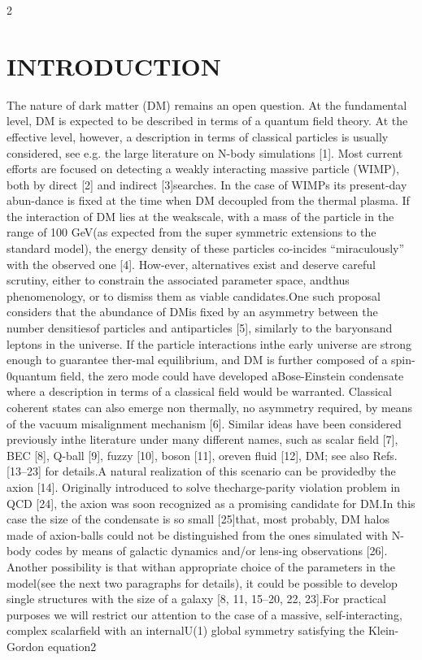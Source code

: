\documentclass{article}
\begin{document}
\begin{multicols} {2}
\section{INTRODUCTION}

The nature of dark matter (DM) remains an open question.   At  the  fundamental  level,  DM  is  expected  to  be described  in  terms  of  a  quantum  field  theory.   At  the effective  level,  however,  a  description  in  terms  of  classical  particles  is  usually  considered,  see  e.g.   the  large literature  on  N-body  simulations  \cite{Boylan_Kolchin_2009}[1].   Most  current  efforts are focused on detecting a weakly interacting massive particle (WIMP), both by direct \cite{Kim_2013}[2] and indirect \cite{Profumo_2012} [3]searches.   In  the  case  of  WIMPs  its  present-day  abun-dance is fixed at the time when DM decoupled from the thermal plasma.  If the interaction of DM lies at the weakscale, with a mass of the particle in the range of 100 GeV(as expected from the super symmetric extensions to the standard model), the energy density of these particles co-incides “miraculously” with the observed one \cite{Bertone_2005}[4].  How-ever,  alternatives  exist  and  deserve  careful  scrutiny,  either  to  constrain  the  associated  parameter  space,  andthus phenomenology, or to dismiss them as viable candidates.One such proposal considers that the abundance of DMis fixed by an asymmetry between the number densitiesof particles and antiparticles \cite{PETRAKI_2013}[5], similarly to the baryonsand leptons in the universe.  If the particle interactions inthe early universe are strong enough to guarantee ther-mal equilibrium, and DM is further composed of a spin-0quantum  field,  the  zero  mode  could  have  developed  aBose-Einstein  condensate  where  a  description  in  terms of a classical field would be warranted.  Classical coherent states can also emerge non thermally, no asymmetry required, by means of the vacuum misalignment mechanism [6]. Similar ideas have been considered previously inthe literature under many different names, such as scalar field  [7],  BEC  [8],  Q-ball  [9],  fuzzy  [10],  boson  [11],  oreven fluid [12], DM; see also Refs. [13–23] for details.A natural realization of this scenario can be providedby  the  axion  [14].   Originally  introduced  to  solve  thecharge-parity violation problem in QCD [24], the axion was  soon  recognized  as  a  promising  candidate  for  DM.In  this  case  the  size  of  the  condensate  is  so  small  [25]that, most probably, DM halos made of axion-balls could not  be  distinguished  from  the  ones  simulated  with  N-body codes by means of galactic dynamics and/or lens-ing  observations  [26].   Another  possibility  is  that  withan  appropriate  choice  of  the  parameters  in  the  model(see  the  next  two  paragraphs  for  details),  it  could  be possible  to  develop  single  structures  with  the  size  of  a galaxy [8, 11, 15–20, 22, 23].For  practical  purposes  we  will  restrict  our  attention to the case of a massive, self-interacting, complex scalarfield  with  an  internalU(1)  global  symmetry  satisfying the Klein-Gordon equation2 

\end{multicols}
\end{document}
